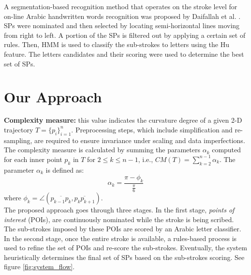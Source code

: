 \documentclass[10pt, conference, compsocconf]{IEEEtran}
\begin{document}
A segmentation-based recognition method that operates on the stroke level for on-line Arabic handwritten words recognition was proposed by Daifallah et al. \cite{daifallah2009recognition}. 
SPs were nominated and then selected by locating semi-horizontal lines moving from right to left. 
A portion of the SPs is filtered out by applying a certain set of rules. 
Then, HMM is used to classify the sub-strokes to letters using the Hu feature. 
The letters candidates and their scoring were used to determine the best set of SPs.


\section{Our Approach}
\label{sec:approach}

\textbf{Complexity measure:} this value indicates the curvature degree of a given 2-D trajectory $T=\{p_i\}_{i=1}^{n}$. 
Preprocessing steps, which include simplification and re-sampling, are required to ensure invariance under scaling and data imperfections. 
The complexity measure is calculated by summing the parameters $\alpha_{k}$ computed for each inner point $p_k$ in $T$ for $2 \leq k \leq n-1$, i.e., $CM(T)=\sum_{k=2}^{n-1}{\alpha_k}$.
The parameter $\alpha_{k}$ is defined as:
\begin{equation}
\alpha_{k}=\frac{\pi-\phi_{k}}{\frac{\pi}{6}}
\end{equation}
where $\phi_k=\angle(\overline{p_{k-1}p_{k}},\overline{p_{k}p_{k+1}})$.\\

The proposed approach goes through three stages. 
In the first stage, \emph{points of interest} (POIs), are continuously nominated while the stroke is being scribed.
The sub-strokes imposed by these POIs are scored by an Arabic letter classifier. 
In the second stage, once the entire stroke is available, a rules-based process is used to refine the set of POIs and re-score the sub-strokes. 
Eventually, the system heuristically determines the final set of SPs based on the sub-strokes scoring. See figure \ref{fig:system_flow}. \\
\end{document}
